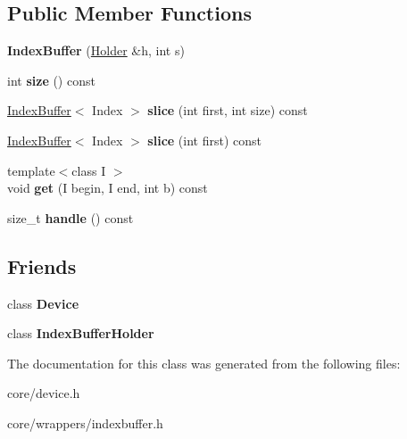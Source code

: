 \subsection*{Public Member Functions}
\begin{DoxyCompactItemize}
\item 
\hypertarget{class_tempest_1_1_index_buffer_a29ac96842a80279fb6da6048fe3670f3}{{\bfseries Index\+Buffer} (\hyperlink{class_tempest_1_1_abstract_holder}{Holder} \&h, int s)}\label{class_tempest_1_1_index_buffer_a29ac96842a80279fb6da6048fe3670f3}

\item 
\hypertarget{class_tempest_1_1_index_buffer_a31345f3ccdc7e29d83c4b86acebada46}{int {\bfseries size} () const }\label{class_tempest_1_1_index_buffer_a31345f3ccdc7e29d83c4b86acebada46}

\item 
\hypertarget{class_tempest_1_1_index_buffer_aba033124166a5ccc2c356cf0a7321ab1}{\hyperlink{class_tempest_1_1_index_buffer}{Index\+Buffer}$<$ Index $>$ {\bfseries slice} (int first, int size) const }\label{class_tempest_1_1_index_buffer_aba033124166a5ccc2c356cf0a7321ab1}

\item 
\hypertarget{class_tempest_1_1_index_buffer_a877a05d3a5ea8d6e46b906ed162e6578}{\hyperlink{class_tempest_1_1_index_buffer}{Index\+Buffer}$<$ Index $>$ {\bfseries slice} (int first) const }\label{class_tempest_1_1_index_buffer_a877a05d3a5ea8d6e46b906ed162e6578}

\item 
\hypertarget{class_tempest_1_1_index_buffer_a6ddf1c05eead33d4e7fb03298cd548dd}{{\footnotesize template$<$class I $>$ }\\void {\bfseries get} (I begin, I end, int b) const }\label{class_tempest_1_1_index_buffer_a6ddf1c05eead33d4e7fb03298cd548dd}

\item 
\hypertarget{class_tempest_1_1_index_buffer_a6fbef5af35ece39d98028a1b33ab2e21}{size\+\_\+t {\bfseries handle} () const }\label{class_tempest_1_1_index_buffer_a6fbef5af35ece39d98028a1b33ab2e21}

\end{DoxyCompactItemize}
\subsection*{Friends}
\begin{DoxyCompactItemize}
\item 
\hypertarget{class_tempest_1_1_index_buffer_a520fa05e0bf58785da428f7a0241eee2}{class {\bfseries Device}}\label{class_tempest_1_1_index_buffer_a520fa05e0bf58785da428f7a0241eee2}

\item 
\hypertarget{class_tempest_1_1_index_buffer_a931bc0ce4135d164772c0f084bac3f11}{class {\bfseries Index\+Buffer\+Holder}}\label{class_tempest_1_1_index_buffer_a931bc0ce4135d164772c0f084bac3f11}

\end{DoxyCompactItemize}


The documentation for this class was generated from the following files\+:\begin{DoxyCompactItemize}
\item 
core/device.\+h\item 
core/wrappers/indexbuffer.\+h\end{DoxyCompactItemize}
